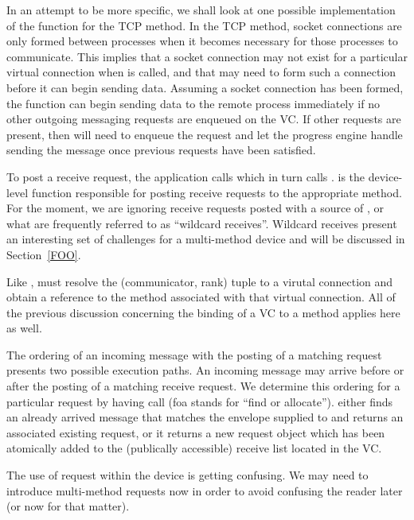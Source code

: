In an attempt to be more specific, we shall look at one possible
implementation of the  function for the TCP method.  In the TCP
method, socket connections are only formed between processes when it becomes
necessary for those processes to communicate.  This implies that a socket
connection may not exist for a particular virtual connection when
 is called, and that  may need to form such a
connection before it can begin sending data.  Assuming a socket connection has
been formed, the  function can begin sending data to the remote
process immediately if no other outgoing messaging requests are enqueued on the
VC.  If other requests are present, then  will need to enqueue
the request and let the progress engine handle sending the message once
previous requests have been satisfied.

To post a receive request, the application calls  which in
turn calls .   is the device-level
function responsible for posting receive requests to the appropriate method.
For the moment, we are ignoring receive requests posted with a source of
, or what are frequently referred to as ``wildcard
receives''.  Wildcard receives present an interesting set of challenges for a
multi-method device and will be discussed in Section~\ref{FOO}.

Like ,  must resolve the (communicator, rank)
tuple to a virutal connection and obtain a reference to the method associated
with that virtual connection.  All of the previous discussion concerning the
binding of a VC to a method applies here as well.

The ordering of an incoming message with the posting of a matching request
presents two possible execution paths.  An incoming message may arrive before
or after the posting of a matching receive request.  We determine this ordering
for a particular request by having  call
 (foa stands for ``find or allocate'').
 either finds an already arrived message that matches
the envelope supplied to  and returns an associated existing
request, or it returns a new request object which has been atomically added to
the (publically accessible) receive list located in the VC.

\begin{cmt}
  The use of request within the device is getting confusing.  We may need to
  introduce multi-method requests now in order to avoid confusing the reader
  later (or now for that matter).
\end{cmt}

